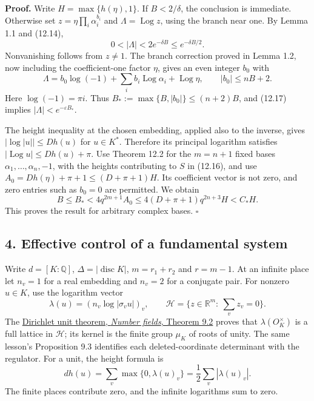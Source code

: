 \documentclass[
  11pt,
  a4paper,
]{article}
\begin{document}
\textbf{Proof.} Write \(H=\max\{h(\eta),1\}\). If \(B<2/\delta\), the
conclusion is immediate. Otherwise set \(z=\eta\prod_i\alpha_i^{b_i}\)
and \(\Lambda=\operatorname{Log}z\), using the branch near one. By Lemma
1.1 and (12.14), \[
0<|\Lambda|<2e^{-\delta B}\le e^{-\delta B/2}.
\tag{12.17}
\] Nonvanishing follows from \(z\ne1\). The branch correction proved in
Lemma 1.2, now including the coefficient-one factor \(\eta\), gives an
even integer \(b_0\) with \[
\Lambda=b_0\log(-1)+\sum_i b_i\operatorname{Log}\alpha_i
                       +\operatorname{Log}\eta,
\qquad |b_0|\le nB+2.
\tag{12.18}
\] Here \(\log(-1)=\pi i\). Thus \(B_*:=\max\{B,|b_0|\}\le(n+2)B\), and
(12.17) implies \(|\Lambda|<e^{-\varepsilon B_*}\).

The height inequality at the chosen embedding, applied also to the
inverse, gives \(|\log|u||\le Dh(u)\) for \(u\in K^*\). Therefore its
principal logarithm satisfies \(|\operatorname{Log}u|\le Dh(u)+\pi\).
Use Theorem 12.2 for the \(m=n+1\) fixed bases
\(\alpha_1,\ldots,\alpha_n,-1\), with the heights contributing to \(S\)
in (12.16), and use \(A_0=Dh(\eta)+\pi+1\le(D+\pi+1)H\). Its coefficient
vector is not zero, and zero entries such as \(b_0=0\) are permitted. We
obtain \[
B\le B_*<4q^{2m+1}A_0
          \le4(D+\pi+1)q^{2n+3}H<C_*H.
\] This proves the result for arbitrary complex bases. \(\square\)

\subsection{4. Effective control of a fundamental
system}\label{effective-control-of-a-fundamental-system}

Write \(d=[K:\mathbb Q]\), \(\Delta=|\operatorname{disc}K|\),
\(m=r_1+r_2\) and \(r=m-1\). At an infinite place let \(n_v=1\) for a
real embedding and \(n_v=2\) for a conjugate pair. For nonzero
\(u\in K\), use the logarithm vector \[
\lambda(u)=(n_v\log|\sigma_vu|)_v,\qquad
\mathcal H=\{z\in\mathbb R^m:\ \textstyle\sum_v z_v=0\}.
\tag{12.19}
\] The
\href{https://kokunoyumeto.github.io/open-math-courses-public/courses/NT-ANT/dirichlets-unit-theorem.html\#producing-enough-units}{Dirichlet
unit theorem, \emph{Number fields}, Theorem 9.2} proves that
\(\lambda(O_K^\times)\) is a full lattice in \(\mathcal H\); its kernel
is the finite group \(\mu_K\) of roots of unity. The same lesson's
Proposition 9.3 identifies each deleted-coordinate determinant with the
regulator. For a unit, the height formula is \[
d h(u)=\sum_v\max\{0,\lambda(u)_v\}
      =\frac12\sum_v|\lambda(u)_v|.
\tag{12.20}
\] The finite places contribute zero, and the infinite logarithms sum to
zero.
\end{document}
